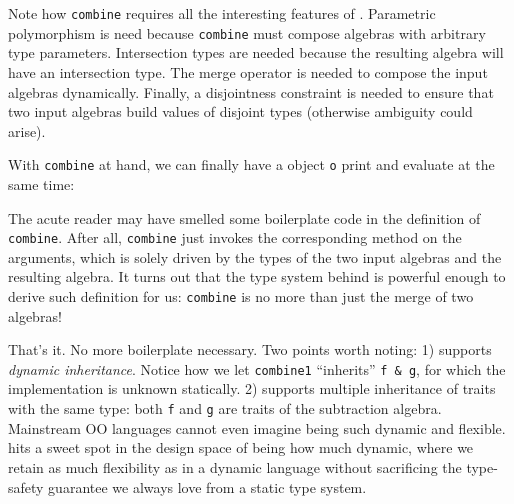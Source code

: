 
Note how \lstinline{combine} requires all the interesting features of \name.
Parametric polymorphism is need because \lstinline{combine} must compose algebras
with arbitrary type parameters. Intersection types are needed because the
resulting algebra will have an intersection type. The merge operator is needed
to compose the input algebras dynamically. Finally, a disjointness constraint is
needed to ensure that two input algebras build values of disjoint types
(otherwise ambiguity could arise).

With \lstinline{combine} at hand, we can finally have a object \lstinline{o}
print and evaluate at the same time:


The acute reader may have smelled some boilerplate code in the definition of
\lstinline{combine}. After all, \lstinline{combine} just invokes the
corresponding method on the arguments, which is solely driven by the types of
the two input algebras and the resulting algebra. It turns out that the type
system behind \name is powerful enough to derive such definition for us:
\lstinline{combine} is no more than just the merge of two algebras!


That's it. No more boilerplate necessary. Two points worth noting: 1) \name
supports \textit{dynamic inheritance}. Notice how we let \lstinline{combine1}
``inherits'' \lstinline{f & g}, for which the implementation is unknown
statically. 2) \name supports multiple inheritance of traits with the same type:
both \lstinline{f} and \lstinline{g} are traits of the subtraction algebra.
Mainstream OO languages cannot even imagine being such dynamic and flexible.
\name hits a sweet spot in the design space of being how much dynamic, where we
retain as much flexibility as in a dynamic language without sacrificing the
type-safety guarantee we always love from a static type system.
